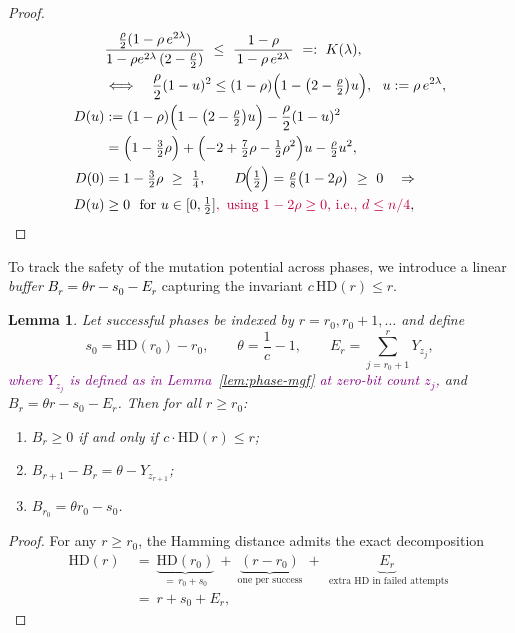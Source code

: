 \documentclass[lettersize,journal]{IEEEtran}
\newcommand{\new}[1]{\textcolor{black}{#1}}
\newcommand{\rerev}[1]{\textcolor{purple}{#1}}
\newcommand{\HD}{\text{HD}}
\newtheorem{lemma}{Lemma}
\begin{document}
{\begin{proof}
\begin{align*}
		&\frac{\tfrac{\rho}{2}(1-\rho\,e^{2\lambda})}{1-\rho e^{2\lambda}\,(2-\tfrac{\rho}{2})}
		\  \le\ \frac{1-\rho}{\,1-\rho\,e^{2\lambda}\,}
		\ =:\ K(\lambda),
		\\&\Longleftrightarrow\quad
		\frac{\rho}{2}(1-u)^2 \le (1-\rho)\Bigl(1-\bigl(2-\tfrac{\rho}{2}\bigr)u\Bigr),\ \ u:=\rho\,e^{2\lambda},
		\\
		D(u)
		&:=(1-\rho)\Bigl(1-\bigl(2-\tfrac{\rho}{2}\bigr)u\Bigr)-\frac{\rho}{2}(1-u)^2
		\\&= \Bigl(1-\tfrac{3}{2}\rho\Bigr)+\Bigl(-2+\tfrac{7}{2}\rho-\tfrac{1}{2}\rho^2\Bigr)u-\tfrac{\rho}{2}u^2,
		\\
		D(0)&=1-\tfrac{3}{2}\rho\ \ge\ \tfrac14,\qquad
		D\!\Big(\tfrac12\Big)=\tfrac{\rho}{8}\bigl(1-2\rho\bigr)\ \ge\ 0
		\quad\Rightarrow\quad \\
		D(u)&\ge 0\ \text{ for }u\in[0,\tfrac12]\rerev{,\text{ using }1-2\rho\ge 0\text{, i.e., }d\le n/4},
	\end{align*}
	
	
\end{proof}


To track the safety of the mutation potential across phases, we introduce a 
linear \emph{buffer} \new{$B_r = \theta r - s_0 - E_r$} capturing the invariant $c\,\mathrm{HD}(r)\le r$.

\begin{lemma}\label{lem:buffer}
	Let successful phases be indexed by $r=r_0,r_0+1,\dots$ and define
	\[
	s_0=\mathrm{HD}(r_0)-r_0, \qquad 
	\theta=\frac{1}{c}-1, \qquad
	E_r=\sum_{j=r_0+1}^{r} Y_{z_j},
	\]
\rerev{where $Y_{z_j}$ is defined as in Lemma~\ref{lem:phase-mgf} at zero-bit count $z_j$,}	and $B_r = \theta r - s_0 - E_r$.
	Then for all $r\ge r_0$:
	\begin{enumerate}
		\item 
		$B_r\ge0$ if and only if $c\cdot\mathrm{HD}(r)\le r$;
		\item 
		$B_{r+1}-B_r=\theta-Y_{z_{r+1}}$;
		\item 
		$B_{r_0}=\theta r_0 - s_0$.
	\end{enumerate}
\end{lemma}

\begin{proof}
	For any $r\ge r_0$, the Hamming distance admits the exact decomposition
	\begin{align*}
		\HD(r)\ &=\ \underbrace{\HD(r_0)}_{=\,r_0+s_0}\ +\ \underbrace{(r-r_0)}_{\text{one per success}}\ +\ \underbrace{E_r}_{\text{ extra HD in failed attempts}}
		\ \\&=\ r+s_0+E_r,		
	\end{align*}
	

\end{proof}}
\end{document}
